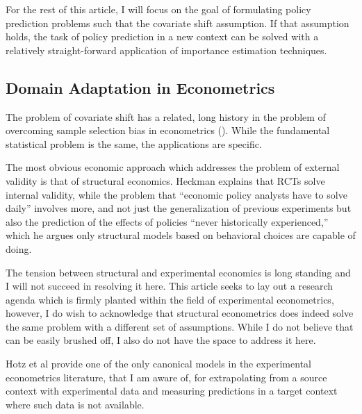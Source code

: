 \documentclass[a4paper,12pt]{article}
\begin{document}
For the rest of this article, I will focus on the goal of formulating policy prediction problems such that the covariate shift assumption. If that assumption holds, the task of policy prediction in a new context can be solved with a relatively straight-forward application of importance estimation techniques.

\subsection{ Domain Adaptation in Econometrics }

The problem of covariate shift has a related, long history in the problem of overcoming sample selection bias in econometrics (\cite{Manski1977}). While the fundamental statistical problem is the same, the applications are specific.

The most obvious economic approach which addresses the problem of external validity is that of structural economics. Heckman \parencite*{Heckman2008} explains that RCTs solve internal validity, while the problem that ``economic policy analysts have to solve daily'' involves more, and not just the generalization of previous experiments but also the prediction of the effects of policies ``never historically experienced,'' which he argues only structural models based on behavioral choices are capable of doing. 

The tension between structural and experimental economics is long standing and I will not succeed in resolving it here. This article seeks to lay out a research agenda which is firmly planted within the field of experimental econometrics, however, I do wish to acknowledge that structural econometrics does indeed solve the same problem with a different set of assumptions. While I do not believe that can be easily brushed off, I also do not have the space to address it here.

Hotz et al \parencite*{Hotz2005} provide one of the only canonical models in the experimental econometrics literature, that I am aware of, for extrapolating from a source context with experimental data and measuring predictions in a target context where such data is not available. 
\end{document}

